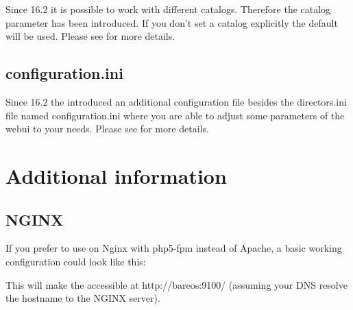 Since 16.2 it is possible to work with different catalogs. Therefore the catalog parameter has been introduced. If you don't set a catalog explicitly the default  will be used. Please see  for more details.

\subsection{configuration.ini}

Since 16.2 the \bareosWebui introduced an additional configuration file besides the directors.ini file named configuration.ini where you are able to adjust some parameters of the webui to your needs. Please see  for more details.


\section{Additional information}

\subsection{NGINX}

If you prefer to use \bareosWebui on Nginx with php5-fpm instead of Apache,
a basic working configuration could look like this:


This will make the \bareosWebui accessible at http://bareos:9100/ (assuming your DNS resolve the hostname  to the NGINX server).
